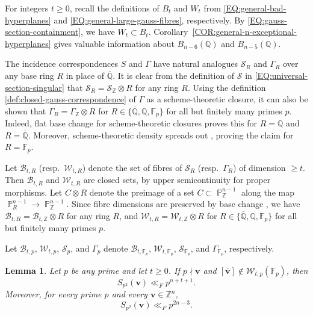\documentclass[a4paper,11pt, twoside,reqno]{amsart}
\theoremstyle{plain}
\newtheorem{lemma}[thm]{Lemma}
\theoremstyle{definition}
\theoremstyle{remark}
\newcommand{\bfv}{\bm{v}}
\newcommand{\ZZ}{\mathbb{Z}}
\newcommand{\QQ}{\mathbb{Q}}
\DeclareMathOperator{\PP}{\mathbb{P}}
\renewcommand{\bar}{\overline}
\renewcommand{\ge}{\geqslant}
\newcommand{\FF}{\mathbb{F}}
\newcommand{\Qbar}{\overline{\mathbb{Q}}}
\numberwithin{equation}{section}
\begin{document}
For integers $t\ge 0$,
recall the definitions of $B_t$ and $W_t$
from \eqref{EQ:general-bad-hyperplanes} and \eqref{EQ:general-large-gauss-fibres},
respectively.
By \eqref{EQ:gauss-section-containment}, we have $W_t \subset B_t$.
Corollary~\ref{COR:general-n-exceptional-hyperplanes}
gives valuable information about $B_{n-6}(\QQ)$ and $B_{n-5}(\QQ)$.

The incidence correspondences $S$ and $\Gamma$
have natural analogues $\mathcal S_R$ and $\Gamma_R$
over any base ring $R$ in place of $\Qbar$.
It is clear from the definition of $\mathcal S$ in \eqref{EQ:universal-section-singular}
that $\mathcal S_R = \mathcal S_\ZZ \otimes R$ for any ring $R$.
Using the definition \eqref{def:closed-gauss-correspondence} of $\Gamma$
as a scheme-theoretic closure, it can also be shown that
$\Gamma_R = \Gamma_\ZZ \otimes R$ for
$R\in \{\Qbar,\QQ,\FF_p\}$ for all but finitely many primes $p$.
Indeed, flat base change for scheme-theoretic closures
\cite[\href{https://stacks.math.columbia.edu/tag/081I}{Tag 081I}]{TSta}
proves this for $R=\QQ$ and $R=\Qbar$.
Moreover, scheme-theoretic density
spreads out \cite[\href{https://stacks.math.columbia.edu/tag/0573}{Tag 0573}]{TSta},
proving the claim for $R=\FF_p$.

Let $\mathcal B_{t,R}$ (resp.~$\mathcal W_{t,R}$)
denote the set of fibres of $\mathcal S_R$ (resp.~$\Gamma_R$)
of dimension $\ge t$.
Then $\mathcal B_{t,R}$ and $\mathcal W_{t,R}$ are closed sets,
by upper semicontinuity for proper morphisms.
Let $C \otimes R$ denote the preimage of a set $C \subset \PP^{n-1}_\ZZ$
along the map $\PP^{n-1}_R \to \PP^{n-1}_\ZZ$.
Since fibre dimensions are preserved by base change
\cite[\href{https://stacks.math.columbia.edu/tag/05F8}{Tag 05F8}]{TSta},
we have $\mathcal B_{t,R} = \mathcal B_{t,\ZZ} \otimes R$ for any ring $R$,
and $\mathcal W_{t,R} = \mathcal W_{t,\ZZ} \otimes R$ for
$R\in \{\Qbar,\QQ,\FF_p\}$ for all but finitely many primes $p$.

Let $\mathcal B_{t,p}$, $\mathcal W_{t,p}$,
$\mathcal S_p$, and $\Gamma_p$
denote $\mathcal B_{t,\FF_p}$, $\mathcal W_{t,\FF_p}$,
$\mathcal S_{\FF_p}$, and $\Gamma_{\FF_p}$,
respectively.
\begin{lemma}
\label{lem:prime-square-stratification}
Let $p$ be any prime and let $t\ge 0$.
If $p\nmid\bfv$ and $[\bar{\bfv}]\notin \mathcal W_{t,p}(\FF_p)$,
then
\begin{equation}
\label{eq:p2-strat-bound}
S_{p^2}(\bfv)\ll_F p^{n+t+1}.
\end{equation}
Moreover, for every prime $p$ and every $\bfv\in\ZZ^n$,
\begin{equation}
\label{eq:p2-cutoff}
S_{p^2}(\bfv)\ll_F p^{2n-3}.
\end{equation}
\end{lemma}
\end{document}
